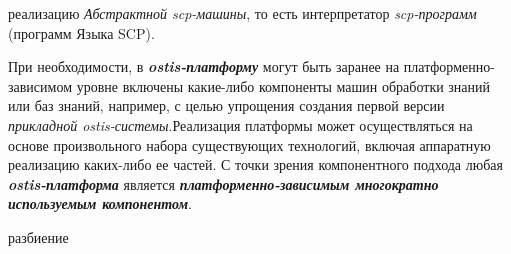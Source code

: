 \begin{SCn}
\begin{scnsubstruct}
{\begin{scnitemize}
			\item реализацию \textit{Абстрактной scp-машины}, то есть интерпретатор \textit{scp-программ} (программ Языка SCP).
		\end{scnitemize}
		При необходимости, в \textbf{\textit{ostis-платформу}} могут быть заранее на платформенно-зависимом уровне включены какие-либо компоненты машин обработки знаний или баз знаний, например, с целью упрощения создания первой версии \textit{прикладной ostis-системы}.Реализация платформы может осуществляться на основе произвольного набора существующих технологий, включая аппаратную реализацию каких-либо ее частей. С точки зрения компонентного подхода любая \textbf{\textit{ostis-платформа}} является \textbf{\textit{платформенно-зависимым многократно используемым компонентом}}.}
	\begin{scnrelfromset}{разбиение}
	\end{scnrelfromset}
	

\end{scnsubstruct}
\end{SCn}
